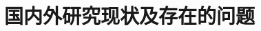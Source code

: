 \documentclass[
    type = master, %
    degree = academic,        %
    decl-page,  %
  ]{njuthesis}
\begin{document}











\section{国内外研究现状及存在的问题}
\end{document}
